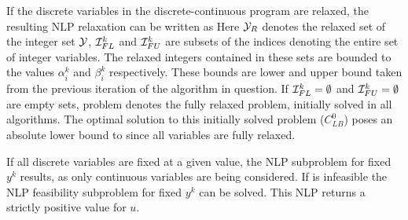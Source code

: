     If the discrete variables in the discrete-continuous program are relaxed, the resulting NLP relaxation
    can be written as
    Here $\mathcal{Y}_R$ denotes the relaxed set of the integer set $\mathcal{Y}$, $\mathcal{I}_{FL}^k$ and
    $\mathcal{I}_{FU}^k$ are subsets of the indices denoting the entire set of integer variables.
    The relaxed integers contained in these sets are  bounded to the values $\alpha_i^k$ and $\beta_i^k$ respectively.
    These bounds are lower and upper bound taken from the previous iteration of the algorithm in question. If
    $\mathcal{I}_{FL}^k = \emptyset$ and $\mathcal{I}_{FU}^k = \emptyset$ are empty sets, problem 
    denotes the fully relaxed problem, initially solved in all algorithms. The optimal solution to this initially solved
    problem ($C_{LB}^0$) poses an absolute lower bound to  since all variables are fully relaxed.

    If all discrete variables are fixed at a given value, the NLP subproblem for fixed $y^k$ results, as
    only continuous variables are being considered.
    If  is infeasible the NLP feasibility subproblem for fixed $y^k$ can be solved.
    This NLP returns a strictly positive value for $u$.


